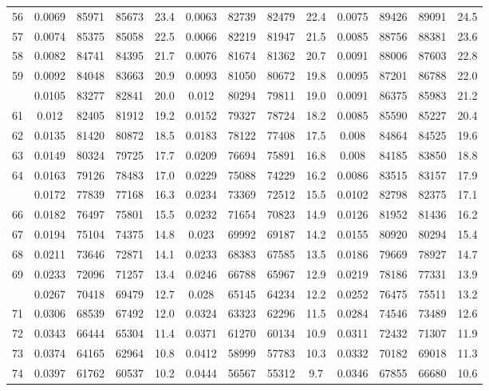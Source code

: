 \documentclass[
  14pt,
]{article}
\begin{document}
\begin{longtable}[t]{lcccccccccccc}
56 & 0.0069 & 85971 & 85673 & 23.4 & 0.0063 & 82739 & 82479 & 22.4 & 0.0075 & 89426 & 89091 & 24.5\\
57 & 0.0074 & 85375 & 85058 & 22.5 & 0.0066 & 82219 & 81947 & 21.5 & 0.0085 & 88756 & 88381 & 23.6\\
58 & 0.0082 & 84741 & 84395 & 21.7 & 0.0076 & 81674 & 81362 & 20.7 & 0.0091 & 88006 & 87603 & 22.8\\
59 & 0.0092 & 84048 & 83663 & 20.9 & 0.0093 & 81050 & 80672 & 19.8 & 0.0095 & 87201 & 86788 & 22.0\\
\addlinespace
60 & 0.0105 & 83277 & 82841 & 20.0 & 0.012 & 80294 & 79811 & 19.0 & 0.0091 & 86375 & 85983 & 21.2\\
61 & 0.012 & 82405 & 81912 & 19.2 & 0.0152 & 79327 & 78724 & 18.2 & 0.0085 & 85590 & 85227 & 20.4\\
62 & 0.0135 & 81420 & 80872 & 18.5 & 0.0183 & 78122 & 77408 & 17.5 & 0.008 & 84864 & 84525 & 19.6\\
63 & 0.0149 & 80324 & 79725 & 17.7 & 0.0209 & 76694 & 75891 & 16.8 & 0.008 & 84185 & 83850 & 18.8\\
64 & 0.0163 & 79126 & 78483 & 17.0 & 0.0229 & 75088 & 74229 & 16.2 & 0.0086 & 83515 & 83157 & 17.9\\
\addlinespace
65 & 0.0172 & 77839 & 77168 & 16.3 & 0.0234 & 73369 & 72512 & 15.5 & 0.0102 & 82798 & 82375 & 17.1\\
66 & 0.0182 & 76497 & 75801 & 15.5 & 0.0232 & 71654 & 70823 & 14.9 & 0.0126 & 81952 & 81436 & 16.2\\
67 & 0.0194 & 75104 & 74375 & 14.8 & 0.023 & 69992 & 69187 & 14.2 & 0.0155 & 80920 & 80294 & 15.4\\
68 & 0.0211 & 73646 & 72871 & 14.1 & 0.0233 & 68383 & 67585 & 13.5 & 0.0186 & 79669 & 78927 & 14.7\\
69 & 0.0233 & 72096 & 71257 & 13.4 & 0.0246 & 66788 & 65967 & 12.9 & 0.0219 & 78186 & 77331 & 13.9\\
\addlinespace
70 & 0.0267 & 70418 & 69479 & 12.7 & 0.028 & 65145 & 64234 & 12.2 & 0.0252 & 76475 & 75511 & 13.2\\
71 & 0.0306 & 68539 & 67492 & 12.0 & 0.0324 & 63323 & 62296 & 11.5 & 0.0284 & 74546 & 73489 & 12.6\\
72 & 0.0343 & 66444 & 65304 & 11.4 & 0.0371 & 61270 & 60134 & 10.9 & 0.0311 & 72432 & 71307 & 11.9\\
73 & 0.0374 & 64165 & 62964 & 10.8 & 0.0412 & 58999 & 57783 & 10.3 & 0.0332 & 70182 & 69018 & 11.3\\
74 & 0.0397 & 61762 & 60537 & 10.2 & 0.0444 & 56567 & 55312 & 9.7 & 0.0346 & 67855 & 66680 & 10.6\\

\end{longtable}
\end{document}
